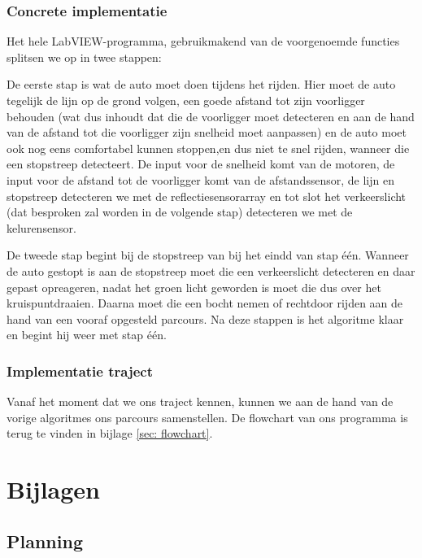 \documentclass[a4paper,twoside,kulak]{kulakreport}
\begin{document}
\subsection{Concrete implementatie}
\bigskip
Het hele LabVIEW-programma, gebruikmakend van de voorgenoemde functies splitsen we op in twee stappen:

De eerste stap is wat de auto moet doen tijdens het rijden. Hier moet de auto tegelijk de lijn op de grond volgen, 
een goede afstand tot zijn voorligger behouden (wat dus inhoudt dat die de voorligger moet detecteren en aan de hand van de afstand tot die voorligger zijn snelheid moet aanpassen) 
en de auto moet ook nog eens comfortabel kunnen stoppen,en dus niet te snel rijden, wanneer die een stopstreep detecteert. 
De input voor de snelheid komt van de motoren, de input voor de afstand tot de voorligger komt van de afstandssensor, de lijn en stopstreep detecteren we met de reflectiesensorarray en tot slot het verkeerslicht (dat besproken zal worden in de volgende stap) detecteren we met de kelurensensor.

De tweede stap begint bij de stopstreep van bij het eindd van stap één. 
Wanneer de auto gestopt is aan de stopstreep moet die een verkeerslicht detecteren en daar gepast opreageren, nadat het groen licht geworden is moet die dus over het kruispuntdraaien. 
Daarna moet die een bocht nemen of rechtdoor rijden aan de hand van een vooraf opgesteld parcours. 
Na deze stappen is het algoritme klaar en begint hij weer met stap één.
	
	\subsection{Implementatie traject}
	
	Vanaf het moment dat we ons traject kennen, kunnen we aan de hand van de vorige algoritmes ons parcours samenstellen. De flowchart van ons programma is terug te vinden in bijlage \ref{sec: flowchart}.
	



	\chapter{Bijlagen}
	\section{Planning}
	\label{sec: planning}
	
	
\end{document}
